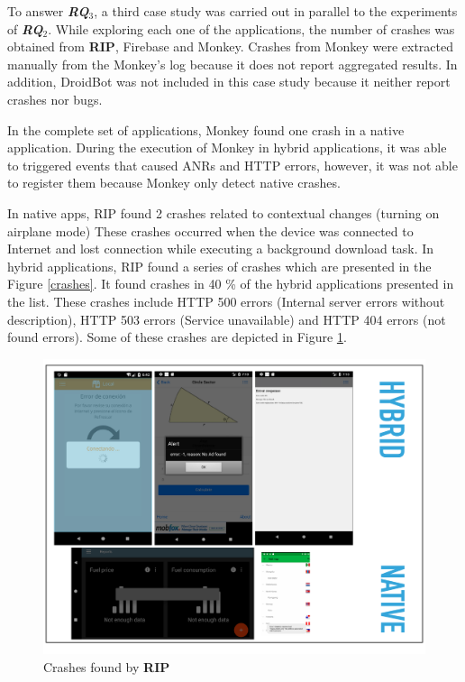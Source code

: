To answer \textit{\textbf{RQ$_3$}}, a third case study was carried out in parallel to the experiments of \textit{\textbf{RQ$_2$}}. While exploring each one of the applications, the number of crashes was obtained from \textbf{RIP}, Firebase and Monkey. Crashes from Monkey were extracted manually from the Monkey's log because it does not report aggregated results. In addition, DroidBot was not included in this case study because it neither report crashes nor bugs.

In the complete set of applications, Monkey found one crash in a native application. During the execution of Monkey in hybrid applications, it was able to triggered events that caused ANRs and HTTP errors, however, it was not able to register them because Monkey only detect native crashes.

In native apps, RIP found 2 crashes related to contextual changes (turning on airplane mode) These crashes occurred when the device was connected to Internet and lost connection while executing a background download task. In hybrid applications, RIP found a series of crashes which are presented in the Figure \ref{crashes}. It found crashes in 40 \% of the hybrid applications presented in the list. These crashes include HTTP 500 errors (Internal server errors without description), HTTP 503 errors (Service unavailable) and HTTP 404 errors (not found errors). Some of these crashes are depicted in Figure \ref{ripFindsCrashes}.

\begin{figure}[t]
	\centering
	\includegraphics[width=1\textwidth]{img/errorHybrid.pdf}
	\vspace{-0.5cm}
	\caption{Crashes found by \textbf{RIP}}
	\label{ripFindsCrashes}
\end{figure} 



